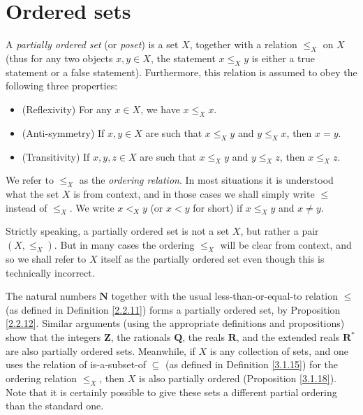 \section{Ordered sets}\label{sec 8.5}

\begin{definition}\label{8.5.1}
    A \emph{partially ordered set} (or \emph{poset}) is a set \(X\), together with a relation \(\leq_X\) on \(X\)
    (thus for any two objects \(x, y \in X\), the statement \(x \leq_X y\) is either a true statement or a false statement).
    Furthermore, this relation is assumed to obey the following three properties:
    \begin{itemize}
        \item (Reflexivity) For any \(x \in X\), we have \(x \leq_X x\).
        \item (Anti-symmetry) If \(x, y \in X\) are such that \(x \leq_X y\) and \(y \leq_X x\), then \(x = y\).
        \item (Transitivity) If \(x, y, z \in X\) are such that \(x \leq_X y\) and \(y \leq_X z\), then \(x \leq_X z\).
    \end{itemize}
    We refer to \(\leq_X\) as the \emph{ordering relation}.
    In most situations it is understood what the set \(X\) is from context, and in those cases we shall simply write \(\leq\) instead of \(\leq_X\).
    We write \(x <_X y\) (or \(x < y\) for short) if \(x \leq_X y\) and \(x \neq y\).
\end{definition}

\begin{note}
    Strictly speaking, a partially ordered set is not a set \(X\), but rather a pair \((X, \leq_X)\).
    But in many cases the ordering \(\leq_X\) will be clear from context, and so we shall refer to \(X\) itself as the partially ordered set even though this is technically incorrect.
\end{note}

\begin{example}\label{8.5.2}
    The natural numbers \(\mathbf{N}\) together with the usual less-than-or-equal-to relation \(\leq\) (as defined in Definition \ref{2.2.11}) forms a partially ordered set, by Proposition \ref{2.2.12}.
    Similar arguments (using the appropriate definitions and propositions) show that the integers \(\mathbf{Z}\), the rationals \(\mathbf{Q}\), the reals \(\mathbf{R}\), and the extended reals \(\mathbf{R}^*\) are also partially ordered sets.
    Meanwhile, if \(X\) is any collection of sets, and one uses the relation of is-a-subset-of \(\subseteq\) (as defined in Definition \ref{3.1.15}) for the ordering relation \(\leq_X\), then \(X\) is also partially ordered (Proposition \ref{3.1.18}).
    Note that it is certainly possible to give these sets a different partial ordering than the standard one.
\end{example}

